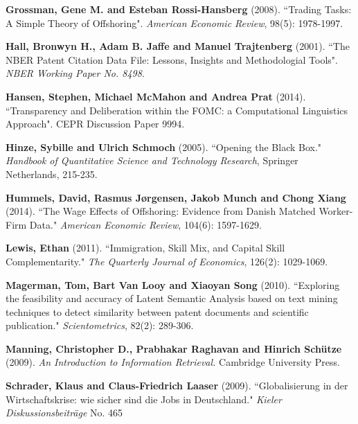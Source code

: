 \documentclass[11pt,a4paper]{article}
\begin{document}
\begin{thebibliography}{9}
	 \textbf{Grossman, Gene M. and Esteban Rossi-Hansberg} (2008). ``Trading Tasks: A Simple Theory of Offshoring". \textit{American Economic Review}, 98(5): 1978-1997.

	 \textbf{Hall, Bronwyn H., Adam B. Jaffe and Manuel Trajtenberg} (2001). ``The NBER Patent Citation Data File: Lessons, Insights and Methodologial Tools". \textit{NBER Working Paper No. 8498}.
	
	 \textbf{Hansen, Stephen, Michael McMahon and Andrea Prat} (2014). ``Transparency and Deliberation within the FOMC:
a Computational Linguistics Approach". CEPR Discussion Paper 9994.

	 \textbf{Hinze, Sybille and Ulrich Schmoch} (2005). ``Opening the Black Box." \textit{Handbook of Quantitative Science and Technology Research}, Springer Netherlands, 215-235.
	
	 \textbf{Hummels, David, Rasmus Jørgensen, Jakob Munch and Chong Xiang} (2014). ``The Wage Effects of Offshoring: Evidence from Danish Matched Worker-Firm Data." \textit{American Economic Review}, 104(6): 1597-1629.
	
	 \textbf{Lewis, Ethan} (2011). ``Immigration, Skill Mix, and Capital Skill Complementarity." \textit{The Quarterly Journal of Economics}, 126(2): 1029-1069.
	
	
	 \textbf{Magerman, Tom, Bart Van Looy and Xiaoyan Song} (2010). ``Exploring the feasibility and accuracy of Latent Semantic Analysis based on text mining techniques to detect similarity between patent documents and scientific publication." \textit{Scientometrics}, 82(2): 289-306.	

	 \textbf{Manning, Christopher D., Prabhakar Raghavan and Hinrich Schütze} (2009). \textit{An Introduction to Information Retrieval.}  Cambridge University Press.
	
	 \textbf{Schrader, Klaus and Claus-Friedrich Laaser} (2009). ``Globalisierung in der Wirtschaftskrise: wie sicher sind die Jobs in Deutschland." \textit{Kieler Diskussionsbeiträge} No. 465
	
		
\end{thebibliography}
\end{document}
